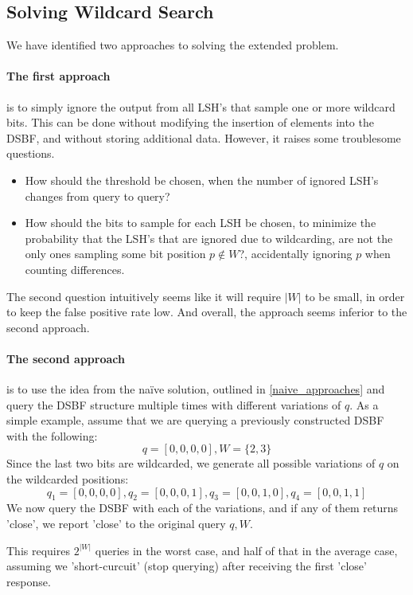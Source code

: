 \documentclass[a4paper,11pt]{article}
\begin{document}
\subsection{Solving Wildcard Search}
We have identified two approaches to solving the extended problem.
\paragraph{The first approach} is to simply ignore the output from all LSH's that sample one or more wildcard bits. This can be done without modifying the insertion of elements into the DSBF, and without storing additional data. However, it raises some troublesome questions.

\begin{itemize}
\item How should the threshold be chosen, when the number of ignored LSH's changes from query to query?
\item How should the bits to sample for each LSH be chosen, to minimize the probability that the LSH's that are ignored due to wildcarding, are not the only ones sampling some bit position $p \notin W$?, accidentally ignoring $p$ when counting differences.
\end{itemize}

The second question intuitively seems like it will require $|W|$ to be small, in order to keep the false positive rate low. And overall, the approach seems inferior to the second approach.

\paragraph{The second approach} is to use the idea from the naïve solution, outlined in \ref{naive_approaches} and query the DSBF structure multiple times with different variations of $q$. As a simple example, assume that we are querying a previously constructed DSBF with the following:
\[q=[0,0,0,0], W=\{2,3\}\]
Since the last two bits are wildcarded, we generate all possible variations of $q$ on the wildcarded positions:
\[q_1=[0,0,0,0], q_2=[0,0,0,1], q_3=[0,0,1,0], q_4=[0,0,1,1]\]
We now query the DSBF with each of the variations, and if any of them returns 'close', we report 'close' to the original query $q, W$.

This requires $2^{|W|}$ queries in the worst case, and half of that in the average case, assuming we 'short-curcuit' (stop querying) after receiving the first 'close' response.
\end{document}
